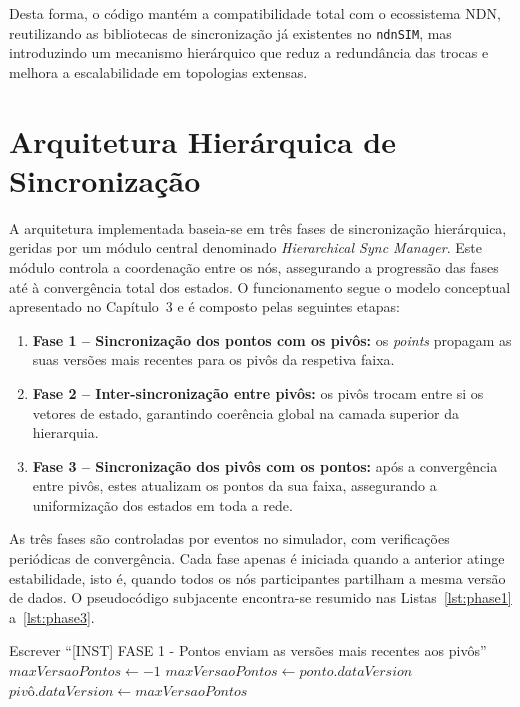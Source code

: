 Desta forma, o código mantém a compatibilidade total com o ecossistema \gls{NDN}, reutilizando as bibliotecas de sincronização já existentes no \texttt{ndnSIM}, mas introduzindo um mecanismo hierárquico que reduz a redundância das trocas e melhora a escalabilidade em topologias extensas.

\section{Arquitetura Hierárquica de Sincronização}

A arquitetura implementada baseia-se em três fases de sincronização hierárquica, geridas por um módulo central denominado \textit{Hierarchical Sync Manager}. Este módulo controla a coordenação entre os nós, assegurando a progressão das fases até à convergência total dos estados. O funcionamento segue o modelo conceptual apresentado no Capítulo~3 e é composto pelas seguintes etapas:

\begin{enumerate}
    \item \textbf{Fase 1 – Sincronização dos pontos com os pivôs:} os \textit{points} propagam as suas versões mais recentes para os pivôs da respetiva faixa.
    \item \textbf{Fase 2 – Inter-sincronização entre pivôs:} os pivôs trocam entre si os vetores de estado, garantindo coerência global na camada superior da hierarquia.
    \item \textbf{Fase 3 – Sincronização dos pivôs com os pontos:} após a convergência entre pivôs, estes atualizam os pontos da sua faixa, assegurando a uniformização dos estados em toda a rede.
\end{enumerate}

As três fases são controladas por eventos no simulador, com verificações periódicas de convergência. Cada fase apenas é iniciada quando a anterior atinge estabilidade, isto é, quando todos os nós participantes partilham a mesma versão de dados. O pseudocódigo subjacente encontra-se resumido nas Listas~\ref{lst:phase1} a~\ref{lst:phase3}.

\begin{algorithm}[H]
\caption{Fase 1 – Sincronização dos Pontos para os Pivôs}
\begin{algorithmic}[1]
\State Escrever ``[INST] FASE 1 - Pontos enviam as versões mais recentes aos pivôs''
\State $maxVersaoPontos \gets -1$
            \State $maxVersaoPontos \gets ponto.dataVersion$
        \EndIf
    \EndIf
\EndFor
{}
        \State $pivô.dataVersion \gets maxVersaoPontos$
    \EndIf
\EndFor
\end{algorithmic}
\end{algorithm}

